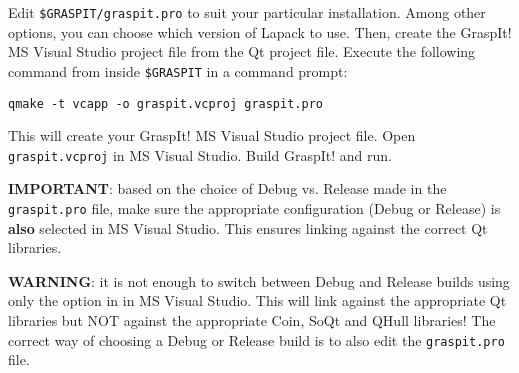 Edit \texttt{\$GRASPIT/graspit.pro} to suit your particular
installation. Among other options, you can choose which version of
Lapack to use. Then, create the GraspIt! MS Visual Studio project file
from the Qt project file. Execute the following command from inside
\texttt{\$GRASPIT} in a command prompt:

\texttt{qmake -t vcapp -o graspit.vcproj graspit.pro}

This will create your GraspIt! MS Visual Studio project file. Open
\texttt{graspit.vcproj} in MS Visual Studio. Build GraspIt! and run.

\textbf{IMPORTANT}: 
based on the choice of Debug vs. Release made in
the \texttt{graspit.pro} file, make sure the appropriate configuration
(Debug or Release) is \textbf{also} selected in MS Visual Studio. This
ensures linking against the correct Qt libraries.

\textbf{WARNING}: it is not enough to switch between Debug and Release builds
using only the option in in MS Visual Studio. This will link against
the appropriate Qt libraries but NOT against the appropriate Coin,
SoQt and QHull libraries! The correct way of choosing a Debug or
Release build is to also edit the \texttt{graspit.pro} file.
